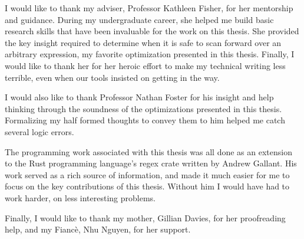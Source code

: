 \begin{thesisacknowledgments}

I would like to thank my adviser, Professor Kathleen Fisher, for her
mentorship and guidance. During my undergraduate career, she helped
me build basic research skills that have been invaluable for the
work on this thesis. She provided the key insight required to
determine when it is safe to scan forward over an arbitrary expression,
my favorite optimization presented in this thesis. Finally,
I would like to thank her for her heroic effort to make my technical
writing less terrible, even when our tools insisted on getting in
the way.

I would also like to thank Professor Nathan Foster for his insight and 
help thinking through the soundness of the optimizations presented
in this thesis. Formalizing my half formed thoughts to convey them
to him helped me catch several logic errors.

The programming work associated with this thesis was all done as
an extension to the Rust programming language's regex crate written
by Andrew Gallant. His work served as a rich source of information,
and made it much easier for me to focus on the key contributions
of this thesis. Without him I would have had to work harder, on
less interesting problems.

Finally, I would like to thank my mother, Gillian Davies, for 
her proofreading help, and my Fianc\`e, Nhu Nguyen, for her
support.

\end{thesisacknowledgments}

